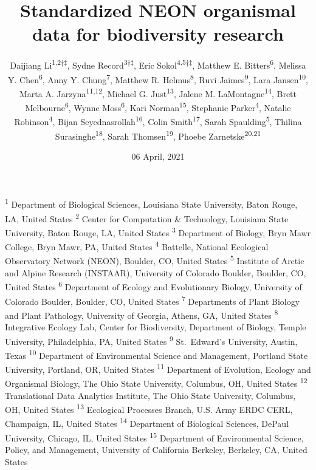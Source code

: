 \documentclass[
  12pt,
]{article}
\title{Standardized NEON organismal data for biodiversity research}
\author{Daijiang Li\textsuperscript{1,2†‡}, Sydne Record\textsuperscript{3†‡}, Eric Sokol\textsuperscript{4,5†‡}, Matthew E. Bitters\textsuperscript{6}, Melissa Y. Chen\textsuperscript{6}, Anny Y. Chung\textsuperscript{7}, Matthew R. Helmus\textsuperscript{8}, Ruvi Jaimes\textsuperscript{9}, Lara Jansen\textsuperscript{10}, Marta A. Jarzyna\textsuperscript{11,12}, Michael G. Just\textsuperscript{13}, Jalene M. LaMontagne\textsuperscript{14}, Brett Melbourne\textsuperscript{6}, Wynne Moss\textsuperscript{6}, Kari Norman\textsuperscript{15}, Stephanie Parker\textsuperscript{4}, Natalie Robinson\textsuperscript{4}, Bijan Seyednasrollah\textsuperscript{16}, Colin Smith\textsuperscript{17}, Sarah Spaulding\textsuperscript{5}, Thilina Surasinghe\textsuperscript{18}, Sarah Thomsen\textsuperscript{19}, Phoebe Zarnetske\textsuperscript{20,21}}
\date{06 April, 2021}
\makeatletter
\newcommand\iraggedright{%
  \let\\\@centercr\@rightskip\@flushglue \rightskip\@rightskip
  \leftskip\z@skip}
\makeatother
\begin{document}
\maketitle

\iraggedright

\footnotesize

\textsuperscript{1} Department of Biological Sciences, Louisiana State University, Baton Rouge, LA, United States\\
\textsuperscript{2} Center for Computation \& Technology, Louisiana State University, Baton Rouge, LA, United States\\
\textsuperscript{3} Department of Biology, Bryn Mawr College, Bryn Mawr, PA, United States\\
\textsuperscript{4} Battelle, National Ecological Observatory Network (NEON), Boulder, CO, United States\\
\textsuperscript{5} Institute of Arctic and Alpine Research (INSTAAR), University of Colorado Boulder, Boulder, CO, United States\\
\textsuperscript{6} Department of Ecology and Evolutionary Biology, University of Colorado Boulder, Boulder, CO, United States\\
\textsuperscript{7} Departments of Plant Biology and Plant Pathology, University of Georgia, Athens, GA, United States\\
\textsuperscript{8} Integrative Ecology Lab, Center for Biodiversity, Department of Biology, Temple University, Philadelphia, PA, United States\\
\textsuperscript{9} St.~Edward's University, Austin, Texas\\
\textsuperscript{10} Department of Environmental Science and Management, Portland State University, Portland, OR, United States\\
\textsuperscript{11} Department of Evolution, Ecology and Organismal Biology, The Ohio State University, Columbus, OH, United States\\
\textsuperscript{12} Translational Data Analytics Institute, The Ohio State University, Columbus, OH, United States\\
\textsuperscript{13} Ecological Processes Branch, U.S. Army ERDC CERL, Champaign, IL, United States\\
\textsuperscript{14} Department of Biological Sciences, DePaul University, Chicago, IL, United States\\
\textsuperscript{15} Department of Environmental Science, Policy, and Management, University of California Berkeley, Berkeley, CA, United States\\
\end{document}
